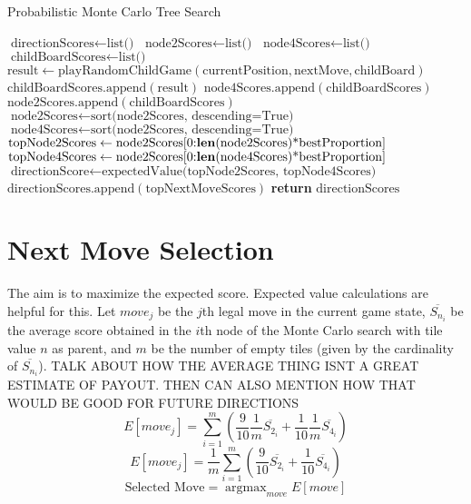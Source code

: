\documentclass{article}
\DeclareMathOperator*{\argmax}{argmax}
\begin{document}
\begin{algorithm}
    \caption{Probabilistic Monte Carlo Tree Search} 
    \begin{algorithmic}[1]
            \State $\text{directionScores} \gets \text{list()}$
                \State $\text{node2Scores} \gets \text{list()}$
                \State $\text{node4Scores} \gets \text{list()}$
                    \State $\text{childBoardScores} \gets \text{list()}$
                        \State $\text{result} \gets \text{playRandomChildGame}(\text{currentPosition}, \text{nextMove}, \text{childBoard})$
                        \State $\text{childBoardScores}.\text{append}(\text{result})$
                    \EndFor
                        \State $\text{node4Scores}.\text{append}(\text{childBoardScores})$
                    \Else
                        \State $\text{node2Scores}.\text{append}(\text{childBoardScores})$
                    \EndIf
                \EndFor
                \State $\text{node2Scores} \gets \text{sort(node2Scores, descending=True)}$
                \State $\text{node4Scores} \gets \text{sort(node2Scores, descending=True)}$
                \State $\text{topNode2Scores} \gets \text{node2Scores[0:\textbf{len}(node2Scores)*bestProportion]}$
                \State $\text{topNode4Scores} \gets \text{node2Scores[0:\textbf{len}(node4Scores)*bestProportion]}$
                \State $\text{directionScore} \gets \text{expectedValue(topNode2Scores, topNode4Scores)}$
                \State $\text{directionScores}.\text{append}(\text{topNextMoveScores})$
            \EndFor
            \State \textbf{return} $\text{directionScores}$
        \EndFunction
    \end{algorithmic}
\end{algorithm}

\section{Next Move Selection}
The aim is to maximize the expected score.  Expected value calculations are helpful for this.  Let $move_j$ be the $j$th legal move in the current game state, $\overline{S_{n_i}}$ be the average score obtained in the $i$th node of the Monte Carlo search with tile value $n$ as parent, and $m$ be the number of empty tiles (given by the cardinality of $\overline{S_{n_i}}$). %
TALK ABOUT HOW THE AVERAGE THING ISNT A GREAT ESTIMATE OF PAYOUT. THEN CAN ALSO MENTION HOW THAT WOULD BE GOOD FOR FUTURE DIRECTIONS
$$E[move_j] = \sum_{i=1}^m \left(\frac{9}{10}\frac{1}{m}\overline{S_{2_i}} + \frac{1}{10}\frac{1}{m}\overline{S_{4_i}}\right)$$
$$E[move_j] = \frac{1}{m}\sum_{i=1}^m \left(\frac{9}{10}\overline{S_{2_i}} + \frac{1}{10}\overline{S_{4_i}}\right)$$
$$\textrm{Selected Move} = \argmax_{move} E[move]$$
\end{document}
